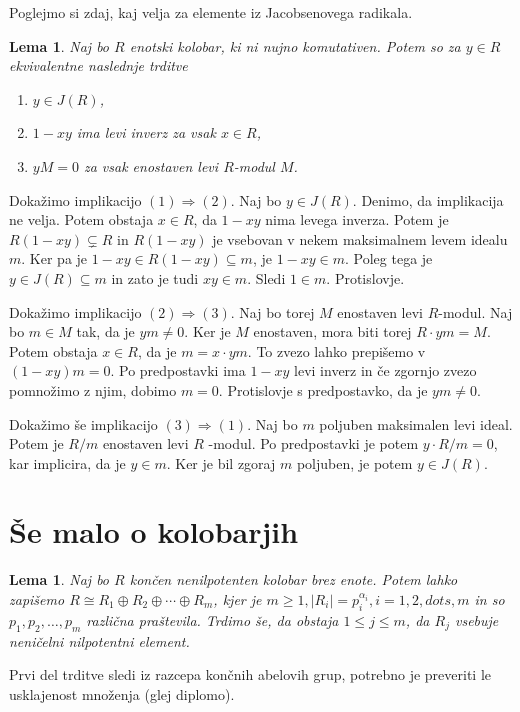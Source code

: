 \documentclass[a4paper, 12pt]{amsart}
\theoremstyle{definition} %
\theoremstyle{plain} %
\newtheorem{lema}[definicija]{Lema}
\begin{document}
Poglejmo si zdaj, kaj velja za elemente iz Jacobsenovega radikala.
\begin{lema}
Naj bo $R$ enotski kolobar, ki ni nujno komutativen. Potem so za $y\in R$ ekvivalentne naslednje trditve
 \begin{enumerate}
 \item $y\in J(R)$,
\item $1-xy$ ima levi inverz za vsak $x\in R$,
\item $ yM = 0$ za vsak enostaven levi $R$-modul $M$.
\end{enumerate}
\end{lema}

\proof
Dokažimo implikacijo $(1) \Rightarrow (2)$. Naj bo $y\in J(R)$. Denimo, da implikacija ne velja. Potem obstaja $x\in R$, da $1-xy$ nima levega inverza. Potem je $R(1-xy) \subsetneq R$ in $R(1-xy)$ je vsebovan v nekem maksimalnem levem idealu $m$. Ker pa je $1-xy \in R(1-xy) \subseteq m$, je $1-xy\in m$. Poleg tega je $y\in J(R) \subseteq m$ in zato je tudi $xy \in m$. Sledi $1\in m$. Protislovje.

Dokažimo implikacijo $(2) \Rightarrow (3)$. Naj bo torej $M$ enostaven levi $R$-modul. Naj bo $m\in M$ tak, da je $ym \neq 0$. Ker je $M$ enostaven, mora biti torej $R\cdot ym = M$. Potem obstaja $x\in R$, da je $m = x\cdot ym$. To zvezo lahko prepišemo v $(1-xy)m=0$. Po predpostavki ima $1-xy$ levi inverz in če zgornjo zvezo pomnožimo z njim, dobimo $m=0$. Protislovje s predpostavko, da je $ym\neq 0$.

Dokažimo še implikacijo $(3) \Rightarrow (1)$. Naj bo $m$ poljuben maksimalen levi ideal. Potem je $R/m$ enostaven levi $R$ -modul. Po predpostavki je potem $y  \cdot R/m = 0$, kar implicira, da je $y\in m$. Ker je bil zgoraj $m$ poljuben, je potem $y\in J(R)$.
\endproof

\section{Še malo o kolobarjih}
\begin{lema}
\label{nilpotent}
Naj bo $R$ končen nenilpotenten kolobar brez enote. Potem lahko zapišemo $R\cong R_1 \oplus R_2 \oplus \cdots \oplus R_m$, kjer je $m \ge 1, |R_i| = p_i^{\alpha_i}, i=1, 2, dots, m$ in so $p_1,p_2,\dots,p_m$ različna praštevila. Trdimo še, da obstaja $1 \le j \le m$, da $R_j$ vsebuje neničelni nilpotentni element.
\end{lema}

\proof
Prvi del trditve sledi iz razcepa končnih abelovih grup, potrebno je preveriti le usklajenost množenja (glej diplomo). 
\end{document}
